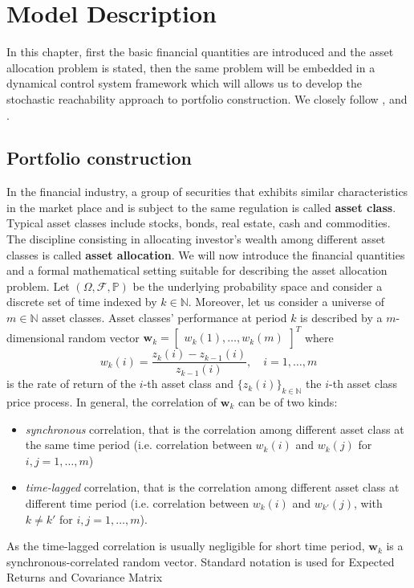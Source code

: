 \chapter{Model Description}\label{chpt:Model_Description}
\glsresetall
In this chapter, first the basic financial quantities are introduced and the asset allocation problem is stated, then the same problem will be embedded in a dynamical control system framework which will allows us to develop the stochastic reachability approach to portfolio construction. We closely follow \cite{Pola12},\cite{Pola06} and \cite{Pola}.
\section{Portfolio construction}
In the financial industry, a group of securities that exhibits similar characteristics in the market place and is subject to the same regulation is called \textbf{asset class}. Typical asset classes include stocks, bonds, real estate, cash and commodities. The discipline consisting in allocating investor's wealth among different asset classes is called \textbf{asset allocation}. We will now introduce the financial quantities and a formal mathematical setting suitable for describing the asset allocation problem. Let $(\Omega,\mathcal{F},\mathbb{P})$ be the underlying  probability space and consider a discrete set of time indexed by $k \in \mathbb{N}$. Moreover, let us consider a universe of $m \in \mathbb{N}$ asset classes. Asset classes' performance at period $k$ is described by a $m$-dimensional random vector 
$\bm{w}_k = \begin{bmatrix} w_k(1),\ldots,w_k(m)\end{bmatrix}^T $ 
where 
$$ w_k(i) = \frac{z_k(i)-z_{k-1}(i)}{z_{k-1}(i)}, \quad i = 1,\ldots,m$$
is the rate of return of the $i$-th asset class and $\{z_k(i)\}_{k \in \mathbb{N}}$ the $i$-th asset class price process. In general, the correlation of $\bm{w}_k$ can be of two kinds:
\begin{itemize}
	\item \textit{synchronous} correlation, that is the correlation among different asset class at the same time period (i.e. correlation between $w_k(i)$ and $w_k(j)$ for $i,j=1,\ldots,m$)
	\item \textit{time-lagged} correlation, that is the correlation among different asset class at different time period (i.e. correlation between $w_k(i)$ and $w_{k'}(j)$, with $k\neq k'$ for $i,j=1,\ldots,m$).
\end{itemize}
As the time-lagged correlation is usually negligible for short time period, $\bm{w}_k$ is a synchronous-correlated random vector. Standard notation is used for Expected Returns and Covariance Matrix 

